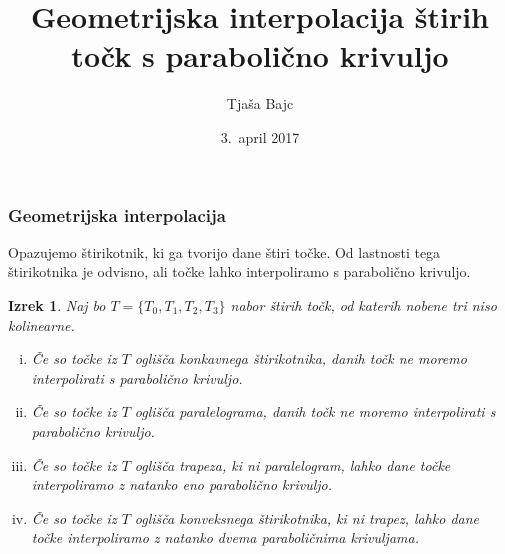 \documentclass{beamer}
\title{Geometrijska interpolacija štirih točk s parabolično krivuljo}
\author{Tjaša Bajc}
\institute{mentorica \\ izr.~prof.~dr.~Marjetka Knez}
\date{3.\ april 2017}
\newtheorem{izrek}{Izrek}
\begin{document}

\begin{frame}
\titlepage
\end{frame}


%
%
%
%
%
%
%



\begin{frame}
\frametitle{Geometrijska interpolacija}

Opazujemo štirikotnik, ki ga tvorijo dane štiri točke. Od lastnosti tega štirikotnika je odvisno, ali točke lahko interpoliramo s parabolično krivuljo.

\begin{izrek}
Naj bo $T = \{ T_0, T_1, T_2, T_3 \}$ nabor štirih točk, od katerih nobene tri niso kolinearne.

\begin{enumerate}[i)]
\pause
\item Če so točke iz $T$ oglišča konkavnega štirikotnika, danih točk ne moremo interpolirati s parabolično krivuljo.
\pause
\item Če so točke iz $T$ oglišča paralelograma, danih točk ne moremo interpolirati s parabolično krivuljo.
\pause
\item Če so točke iz $T$ oglišča trapeza, ki ni paralelogram, lahko dane točke interpoliramo z natanko eno parabolično krivuljo.
\pause
\item Če so točke iz $T$ oglišča konveksnega štirikotnika, ki ni trapez, lahko dane točke interpoliramo z natanko dvema paraboličnima krivuljama.
\end{enumerate}

\end{izrek}

\end{frame}
\end{document}
